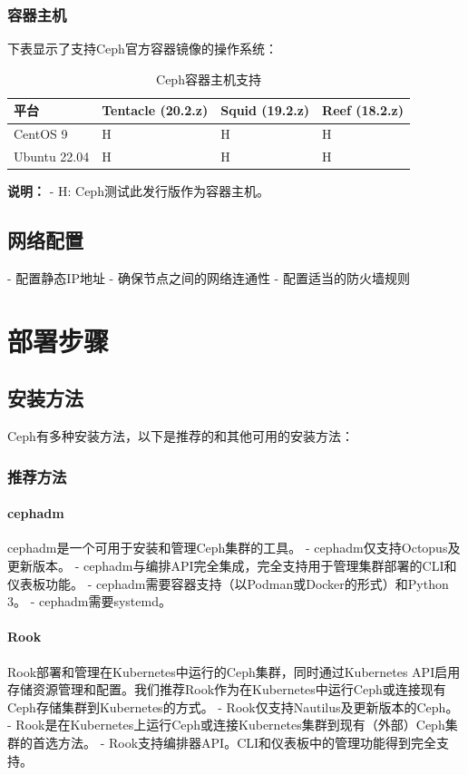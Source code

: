 \documentclass[12pt,UTF8]{ctexbook}
\begin{document}
\subsubsection{容器主机}
下表显示了支持Ceph官方容器镜像的操作系统：

\begin{table}[htbp]
\centering
\caption{Ceph容器主机支持}
\begin{tabular}{|l|l|l|l|}
\hline
\textbf{平台} & \textbf{Tentacle (20.2.z)} & \textbf{Squid (19.2.z)} & \textbf{Reef (18.2.z)} \\
\hline
CentOS 9 & H & H & H \\
Ubuntu 22.04 & H & H & H \\
\hline
\end{tabular}
\end{table}

\textbf{说明：}
- H: Ceph测试此发行版作为容器主机。

\subsection{网络配置}
- 配置静态IP地址
- 确保节点之间的网络连通性
- 配置适当的防火墙规则

\section{部署步骤}

\subsection{安装方法}
Ceph有多种安装方法，以下是推荐的和其他可用的安装方法：

\subsubsection{推荐方法}
\paragraph{cephadm}
cephadm是一个可用于安装和管理Ceph集群的工具。
- cephadm仅支持Octopus及更新版本。
- cephadm与编排API完全集成，完全支持用于管理集群部署的CLI和仪表板功能。
- cephadm需要容器支持（以Podman或Docker的形式）和Python 3。
- cephadm需要systemd。

\paragraph{Rook}
Rook部署和管理在Kubernetes中运行的Ceph集群，同时通过Kubernetes API启用存储资源管理和配置。我们推荐Rook作为在Kubernetes中运行Ceph或连接现有Ceph存储集群到Kubernetes的方式。
- Rook仅支持Nautilus及更新版本的Ceph。
- Rook是在Kubernetes上运行Ceph或连接Kubernetes集群到现有（外部）Ceph集群的首选方法。
- Rook支持编排器API。CLI和仪表板中的管理功能得到完全支持。
\end{document}
